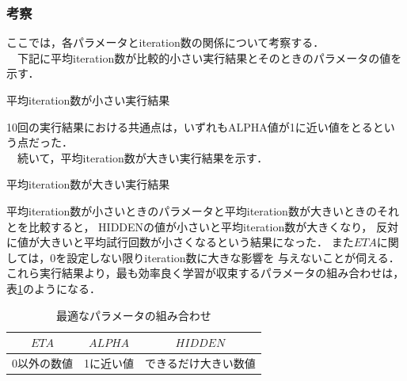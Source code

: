 \subsubsection{考察}
ここでは，各パラメータとiteration数の関係について考察する． \\
　下記に平均iteration数が比較的小さい実行結果とそのときのパラメータの値を示す．
\begin{itembox}[c]{平均iteration数が小さい実行結果}
    {\small
    }
\end{itembox}
10回の実行結果における共通点は，いずれもALPHA値が1に近い値をとるという点だった． \\
　続いて，平均iteration数が大きい実行結果を示す．

\begin{itembox}[c]{平均iteration数が大きい実行結果}
    {\small
    }
\end{itembox}

平均iteration数が小さいときのパラメータと平均iteration数が大きいときのそれとを比較すると，
HIDDENの値が小さいと平均iteration数が大きくなり，
反対に値が大きいと平均試行回数が小さくなるという結果になった．
また$ETA$に関しては，0を設定しない限りiteration数に大きな影響を
与えないことが伺える．
これら実行結果より，最も効率良く学習が収束するパラメータの組み合わせは，表\ref{table:parameters}のようになる．

\begin{table}[htb]
 \begin{center}
  \begin{tabular}[htb]{|c|c|c|} \hline
   $ETA$ & $ALPHA$ & $HIDDEN$ \\ \hline \hline
   0以外の数値 & 1に近い値 & できるだけ大きい数値\\ \hline
  \end{tabular}
  \caption{最適なパラメータの組み合わせ}
  \label{table:parameters}
 \end{center}
\end{table}
